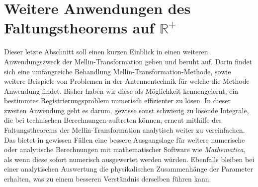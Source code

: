 %
%
%

\section{Weitere Anwendungen des Faltungstheorems auf $\mathbb{R^+}$
\label{mellin:section:teil5}}
Dieser letzte Abschnitt soll einen kurzen Einblick in einen 
weiteren Anwendungszweck der Mellin-Transformation geben und 
beruht auf\cite{mellin:mellin-transform-method}.
Darin findet sich eine umfangreiche Behandlung 
Mellin-Transformation-Methode, sowie weitere Beispiele 
von Problemen in der Antennentechnik für welche die Methode 
Anwendung findet.
Bisher haben wir diese als Möglichkeit kennengelernt, ein 
bestimmtes Registrierungsproblem numerisch effizienter zu lösen.
In dieser zweiten Anwendung geht es darum, gewisse sonst schwierig 
zu lösende Integrale, die bei technischen Berechnungen auftreten 
können, erneut mithilfe des Faltungstheorems der Mellin-Transformation 
analytisch weiter zu vereinfachen.
Das bietet in gewissen Fällen eine bessere Ausgangslage für weitere 
numerische oder analytische Berechnungen mit mathematischer Software 
wie {\em Mathematica}, als wenn diese sofort numerisch ausgewertet 
werden würden.
Ebenfalls bleiben bei einer analytischen Auswertung die physikalischen 
Zusammenhänge der Parameter erhalten, was zu einem besseren Verständnis 
derselben führen kann.

